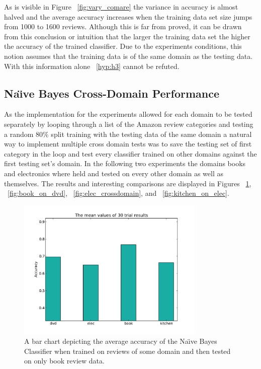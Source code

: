 \documentclass{llncs}
\begin{document}
As is visible in Figure ~\ref{fig:vary_comare} the variance in accuracy is almost halved and the average accuracy increases when the training data set size jumps from 1000 to 1600 reviews. Although this is far from proved, it can be drawn from this conclusion or intuition that the larger the training data set the higher the accuracy of the trained classifier. Due to the experiments conditions, this notion assumes that the training data is of the same domain as the testing data. With this information alone ~\ref{hyp:h3} cannot be refuted.

\subsection{Na\"\i ve Bayes Cross-Domain Performance}
As the implementation for the experiments allowed for each domain to be tested separately by looping through a list of the Amazon review categories and testing a random 80\% split training with the testing data of the same domain a natural way to implement multiple cross domain tests was to save the testing set of first category in the loop and test every classifier trained on other domains against the first testing set's domain. In the following two experiments the domains books and electronics where held and tested on every other domain as well as themselves. The results and interesting comparisons are displayed in Figures ~\ref{fig:book_crossdomain}, ~\ref{fig:book_on_dvd}, ~\ref{fig:elec_crossdomain}, and ~\ref{fig:kitchen_on_elec}.

\begin{figure}
    \centering
    \includegraphics[width=0.8\textwidth]{crossdomain_book_nb.pdf}
    \caption{A bar chart depicting the average accuracy of the Na\"\i ve Bayes Classifier when trained on reviews of some domain and then tested on only book review data.}
    \label{fig:book_crossdomain}
\end{figure}
\end{document}
